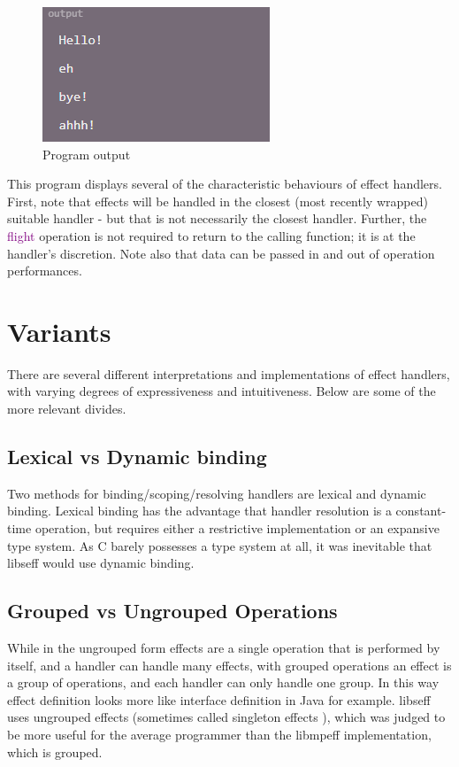 \documentclass[logo,bsc,singlespacing,parskip,online]{infthesis}
\begin{document}
\begin{figure}[h]
    \centering
    \includegraphics[width=0.5\linewidth]{effekt_2_out.png}
    \caption{Program output}
\end{figure}

This program displays several of the characteristic behaviours of effect handlers. First, note that effects will be handled in the closest (most recently wrapped) suitable handler - but that is not necessarily the closest handler. Further, the \textcolor{purple}{flight} operation is not required to return to the calling function; it is at the handler's discretion. Note also that data can be passed in and out of operation performances.


\section{Variants}
There are several different interpretations and implementations of effect handlers, with varying degrees of expressiveness and intuitiveness. Below are some of the more relevant divides.

\subsection{Lexical vs Dynamic binding}

Two methods for binding/scoping/resolving handlers are lexical and dynamic binding. Lexical binding has the advantage that handler resolution is a constant-time operation, but requires either a restrictive implementation or an expansive type system. As C barely possesses a type system at all, it was inevitable that libseff would use dynamic binding.

\subsection{Grouped vs Ungrouped Operations}

While in the ungrouped form effects are a single operation that is performed by itself, and a handler can handle many effects, with grouped operations an effect is a group of operations, and each handler can only handle one group. In this way effect definition looks more like interface definition in Java for example. libseff uses ungrouped effects (sometimes called singleton effects \citep{effekt-website}), which was judged to be more useful for the average programmer than the libmpeff implementation, which is grouped.
\end{document}
